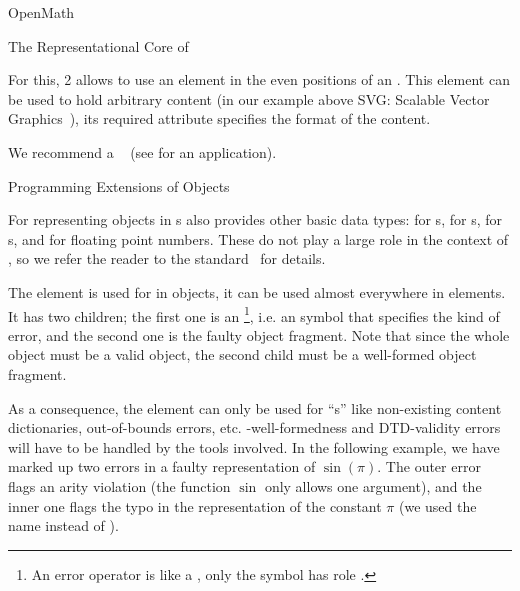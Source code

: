 \begin{omgroup}[id=mobj,short=Mathematical Objects]
\begin{omgroup}[id=openmath]{OpenMath}
\begin{module}[id=OpenMath]
\begin{omgroup}[id=om.core]{The Representational Core of {\openmath}}
\begin{definition}[id=omforeign.def]
  For this, {\openmath}2 allows to use an {} element in the
  even positions of an {}. This element can be used to hold
  arbitrary {\xml} content (in our example above SVG: Scalable Vector
  Graphics~\cite{W3C:svg02}), its required {}
  attribute specifies the format of the content.
\end{definition}

We recommend a {}~\cite{FreBor:MIME96} (see {} for an
application).
\end{omgroup}

\begin{omgroup}[id=om.error]{Programming Extensions of {\openmath} Objects}

\begin{definition}[id=omi.def]
  For representing objects in {s} {\openmath} also
  provides other basic data types: {} for {s},
  {} for {s}, {} for
  {s}, and {} for floating point numbers. These do
  not play a large role in the context of {\omdoc}, so we refer the reader to the
  {\openmath} standard~\cite{BusCapCar:2oms04} for details.
\end{definition}

\begin{definition}[id=ome.def]
  The {} element is used for {} in
  {\openmath} objects, it can be used almost everywhere in {\openmath} elements. It has
  two children; the first one is an {}\footnote{An error operator
    is like a {}, only the symbol has role
    {}.}, i.e. an {\openmath} symbol that specifies the kind
  of error, and the second one is the faulty {\openmath} object fragment. Note that since
  the whole object must be a valid {\openmath} object, the second child must be a
  well-formed {\openmath} object fragment.
\end{definition}
As a consequence, the {} element can only be used for
``{s}'' like non-existing content dictionaries, out-of-bounds
errors, etc.  {\xml}-well-formedness and DTD-validity errors will have to be handled by
the {\xml} tools involved. In the following example, we have marked up two errors in a
faulty representation of $\sin(\pi)$.  The outer error flags an arity violation (the
function $\sin$ only allows one argument), and the inner one flags the typo in the
representation of the constant $\pi$ (we used the name {} instead of
{}).


\end{omgroup}
\end{module}
\end{omgroup}
\end{omgroup}
